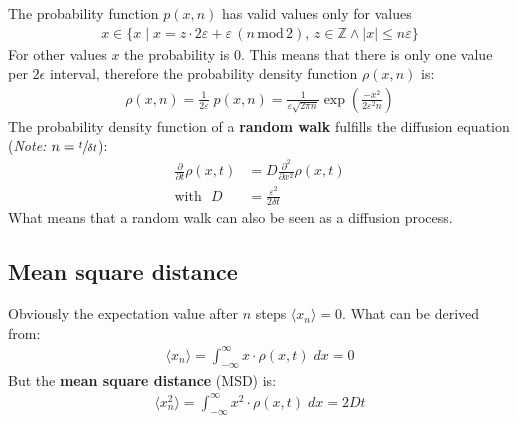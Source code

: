 \documentclass[a4paper, parskip=half]{scrartcl}
\newcommand{\effect}[1]{%
	\textbf{#1}%
}
\begin{document}
The probability function $p(x,n)$ has valid values only for values 
\begin{align}
x \in \{x\; |\; x = z \cdot 2 \varepsilon + \varepsilon\, (n\,\mathrm{mod}\, 2),\, z \in \mathbb{Z} \wedge |x| \leq n \varepsilon\} 
\end{align}
For other values $x$ the probability is $0$. This means that there is only one value per $2\epsilon$ interval, therefore the probability density function $\rho(x,n)$ is:
\begin{align}
\rho(x,n) = \frac{1}{2\varepsilon}\; p(x,n) = \frac{1}{\varepsilon\sqrt{2\pi n}} \exp\left(\frac{-x^2}{2\varepsilon^2 n} \right)
\end{align}
The probability density function of a \effect{random walk} fulfills the diffusion equation (\textit{Note: }$n = \sfrac{t}{\delta t}$):
\begin{align}
\frac{\partial}{\partial t} \rho(x,t) &= D \frac{\partial^2}{\partial x^2 } \rho(x,t) \\
\mathrm{with} \, \, \,\, D &= \frac{\varepsilon^2}{2 \delta t}
\end{align}
What means that a random walk can also be seen as a diffusion process.
\subsection{Mean square distance}
Obviously the expectation value after $n$ steps $\langle x_n\rangle = 0$. What can be derived from:
\begin{align}
\langle x_n\rangle = \int_{-\infty}^\infty x \cdot \rho(x,t)\; dx = 0
\end{align}
But the \effect{mean square distance} (MSD) is:
\begin{align}
\langle x_n^2\rangle = \int_{-\infty}^\infty x^2 \cdot \rho(x,t)\; dx = 2 D t
\end{align}
\end{document}
